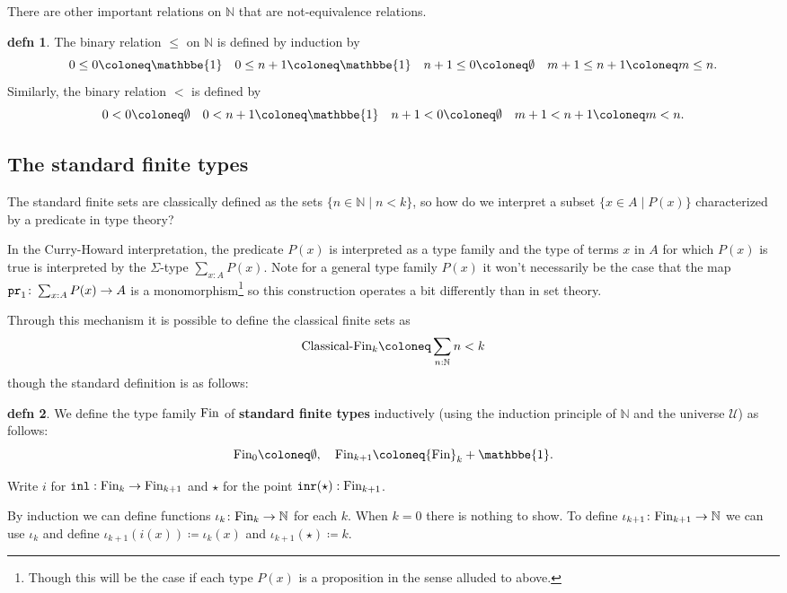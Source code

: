 \documentclass{amsart}
\theoremstyle{theorem}
\theoremstyle{definition}
\newtheorem*{defn}{defn}
\theoremstyle{remark}
\newcommand{\0}{\mathbbe{0}}
\newcommand{\1}{\mathbbe{1}}
\newcommand{\2}{\mathbbe{2}}
\newcommand{\3}{\mathbbe{3}}
\newcommand{\4}{\mathbbe{4}}
\newcommand{\term}[1]{{\textup{\texttt{#1}}}}
\newcommand{\type}[1]{{\textup{#1}}}
\newcommand{\bN}{{\mathbb{N}}}
\newcommand{\inl}{\term{inl}}
\newcommand{\inr}{\term{inr}}
\newcommand{\pr}{\term{pr}}
\newcommand{\UU}{{\mathcal{U}}}
\begin{document}
There are other important relations on $\bN$ that are not-equivalence relations.

\begin{defn} The binary relation $\leq$ on $\bN$ is defined by induction by
  \[ 0 \leq 0 \coloneq \1 \quad 0 \leq n+1 \coloneq \1 \quad n+1 \leq 0 \coloneq \emptyset \quad m+1 \leq n+1 \coloneq m \leq n.\]
  Similarly, the binary relation $<$ is defined by
  \[ 0 < 0 \coloneq \emptyset \quad 0 < n+1 \coloneq \1 \quad n+1 < 0 \coloneq \emptyset \quad m+1 < n+1 \coloneq m < n.\]
  \end{defn}

\subsection*{The standard finite types}

The standard finite sets are classically defined as the sets $\{ n \in \bN \mid n < k\}$, so how do we interpret a subset $\{ x  \in A \mid P(x)\}$ characterized by a predicate in type theory?

In the Curry-Howard interpretation, the predicate $P(x)$ is interpreted as a type family and the type of terms $x$ in $A$ for which $P(x)$ is true is interpreted by the $\Sigma$-type $\sum_{x : A} P(x)$. Note for a general type family $P(x)$ it won't necessarily be the case that the map $\pr_1 \colon \sum_{x :A} P(x) \to A$ is a monomorphism\footnote{Though this will be the case if each type $P(x)$ is a proposition in the sense alluded to above.} so this construction operates a bit differently than in set theory.

Through this mechanism it is possible to define the classical finite sets as 
\[ \type{Classical-Fin}_k \coloneq \sum_{n : \bN}n < k \]
though the standard definition is as follows:

\begin{defn} We define the type family $\type{Fin}$ of \textbf{standard finite types} inductively (using the induction principle of $\bN$ and the universe $\UU$) as follows:
\[ \type{Fin}_0 \coloneq \emptyset, \quad \type{Fin}_{k+1} \coloneq \type{Fin}_k + \1.\]
\end{defn}

Write $i$ for $\inl : \type{Fin}_k \to \type{Fin}_{k+1}$ and $\star$ for the point $\inr(\star) : \type{Fin}_{k+1}$.

By induction we can define functions $\iota_k \colon \type{Fin}_k \to \bN$ for each $k$. When $k=0$ there is nothing to show. To define $\iota_{k+1} \colon \type{Fin}_{k+1} \to \bN$ we can use $\iota_k$  and define $\iota_{k+1}(i(x)) \coloneq \iota_k(x)$ and $\iota_{k+1}(\star)\coloneq k$.
\end{document}
